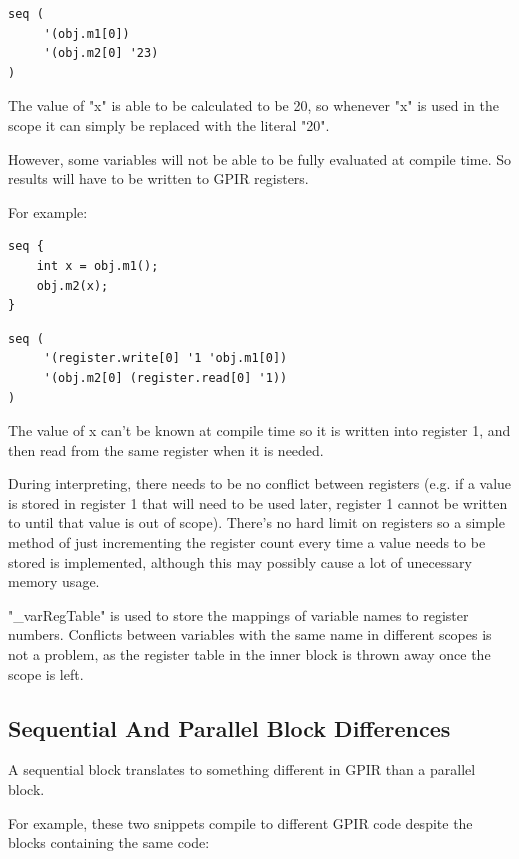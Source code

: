 \begin{lstlisting}[style=myGPIR, frame=single]
seq (
     '(obj.m1[0]) 
     '(obj.m2[0] '23)
)
\end{lstlisting}

The value of "x" is able to be calculated to be 20, so whenever
"x" is used in the scope it can simply be replaced with the literal "20".

However, some variables will not be able to be fully evaluated at compile time.
So results will have to be written to GPIR registers.

For example:

\begin{lstlisting}[style=myGPC, frame=single]
seq {
    int x = obj.m1();
    obj.m2(x);
}
\end{lstlisting}

\begin{lstlisting}[style=myGPIR, frame=single]
seq (
     '(register.write[0] '1 'obj.m1[0]) 
     '(obj.m2[0] (register.read[0] '1))
)
\end{lstlisting}

The value of x can't be known at compile time so it is written into register 1,
and then read from the same register when it is needed.

During interpreting, there needs to be no conflict between registers (e.g. if a value
is stored in register 1 that will need to be used later, register 1 cannot be written to
until that value is out of scope). There's no hard limit on registers so a simple
method of just incrementing the register count every time a value needs to be stored
is implemented, although this may possibly cause a lot of unecessary memory usage.

"\_varRegTable" is used to store the mappings of variable names to register numbers. 
Conflicts between variables with the same name in different scopes is not a problem,
as the register table in the inner block is thrown away once the scope is left.

\subsection{Sequential And Parallel Block Differences}
A sequential block translates to something different in GPIR than a parallel block.

For example, these two snippets compile to different GPIR code despite
the blocks containing the same code:\\



